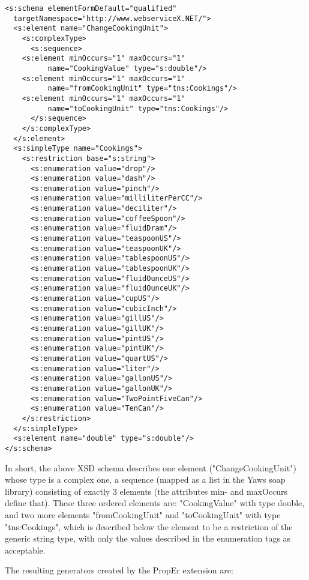 \documentclass[submission,copyright,a4]{eptcs}
\begin{document}
\begin{lstlisting}
<s:schema elementFormDefault="qualified"
  targetNamespace="http://www.webserviceX.NET/">
  <s:element name="ChangeCookingUnit">
    <s:complexType>
      <s:sequence>
	<s:element minOccurs="1" maxOccurs="1" 
          name="CookingValue" type="s:double"/>
	<s:element minOccurs="1" maxOccurs="1"
          name="fromCookingUnit" type="tns:Cookings"/>
	<s:element minOccurs="1" maxOccurs="1" 
          name="toCookingUnit" type="tns:Cookings"/>
      </s:sequence>
    </s:complexType>
  </s:element>
  <s:simpleType name="Cookings">
    <s:restriction base="s:string">
      <s:enumeration value="drop"/>
      <s:enumeration value="dash"/>
      <s:enumeration value="pinch"/>
      <s:enumeration value="milliliterPerCC"/>
      <s:enumeration value="deciliter"/>
      <s:enumeration value="coffeeSpoon"/>
      <s:enumeration value="fluidDram"/>
      <s:enumeration value="teaspoonUS"/>
      <s:enumeration value="teaspoonUK"/>
      <s:enumeration value="tablespoonUS"/>
      <s:enumeration value="tablespoonUK"/>
      <s:enumeration value="fluidOunceUS"/>
      <s:enumeration value="fluidOunceUK"/>
      <s:enumeration value="cupUS"/>
      <s:enumeration value="cubicInch"/>
      <s:enumeration value="gillUS"/>
      <s:enumeration value="gillUK"/>
      <s:enumeration value="pintUS"/>
      <s:enumeration value="pintUK"/>
      <s:enumeration value="quartUS"/>
      <s:enumeration value="liter"/>
      <s:enumeration value="gallonUS"/>
      <s:enumeration value="gallonUK"/>
      <s:enumeration value="TwoPointFiveCan"/>
      <s:enumeration value="TenCan"/>
    </s:restriction>
  </s:simpleType>
  <s:element name="double" type="s:double"/>
</s:schema>

\end{lstlisting}

In short, the above XSD schema describes one element ("ChangeCookingUnit") whose type is a complex one, a sequence (mapped as a list in the Yaws soap library) consisting of exactly 3 elements (the attributes min- and maxOccurs define that). These three ordered elements are: "CookingValue" with type double, and two more elements "fromCookingUnit" and "toCookingUnit" with type "tns:Cookings", which is described below the element to be a restriction of the generic string type, with only the values described in the enumeration tags as acceptable. 

The resulting generators created by the PropEr extension are:
\end{document}
